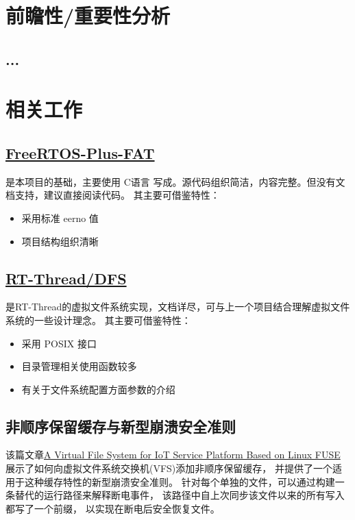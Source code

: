 \documentclass[UTF8,a4paper]{ctexart}
\begin{document}
\section{前瞻性/重要性分析}
\subsection{...}
\section{相关工作}
\subsection{\href{https://www.freertos.org/zh-cn-cmn-s/FreeRTOS-Plus/FreeRTOS_Plus_FAT/index.html}{FreeRTOS-Plus-FAT}}
是本项目的基础，主要使用 C语言 写成。源代码组织简洁，内容完整。但没有文档支持，建议直接阅读代码。
其主要可借鉴特性：
\begin{itemize}
    \item 采用标准 eerno 值
    \item 项目结构组织清晰
\end{itemize}
\subsection{\href{https://www.rt-thread.org/document/site/\#/rt-thread-version/rt-thread-standard/programming-manual/filesystem/filesystem}{RT-Thread/DFS}}
是RT-Thread的虚拟文件系统实现，文档详尽，可与上一个项目结合理解虚拟文件系统的一些设计理念。
其主要可借鉴特性：
\begin{itemize}
    \item 采用 POSIX 接口
    \item 目录管理相关使用函数较多
    \item 有关于文件系统配置方面参数的介绍
\end{itemize}

\subsection{非顺序保留缓存与新型崩溃安全准则}
该篇文章\href{run:./ref/Modular Integration of Crashsafe Caching into a Verified Virtual File System Switch.pdf}{A Virtual File System for IoT Service Platform Based on Linux FUSE}
展示了如何向虚拟文件系统交换机(VFS)添加非顺序保留缓存，
并提供了一个适用于这种缓存特性的新型崩溃安全准则。
针对每个单独的文件，可以通过构建一条替代的运行路径来解释断电事件，
该路径中自上次同步该文件以来的所有写入都写了一个前缀，
以实现在断电后安全恢复文件。
\end{document}

